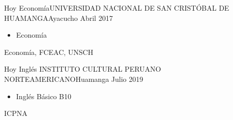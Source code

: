 \begin{experiences}

  \experience
  {Hoy}    {Economía}{UNIVERSIDAD NACIONAL DE SAN CRISTÓBAL DE HUAMANGA}{Ayacucho}
  {Abril 2017}   {
    \begin{itemize}
      \item Economía
    \end{itemize}
  }
  {Economía, FCEAC, UNSCH}
  \emptySeparator

  \experience
  {Hoy}    {Inglés}{ INSTITUTO CULTURAL PERUANO NORTEAMERICANO}{Huamanga}
  {Julio 2019}   {
    \begin{itemize}
      \item  Inglés Básico B10
    \end{itemize}
  }
  {ICPNA}
  \emptySeparator


\end{experiences}




